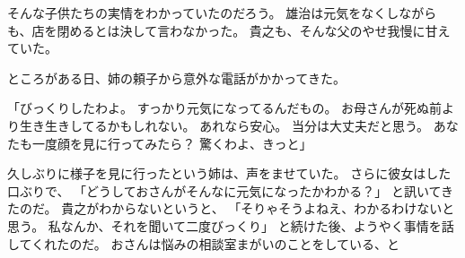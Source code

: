 \documentclass[chapter3.tex]{subfiles}
\begin{document}
\begin{CJK}{UTF8}{ipxm}
    そんな子供たちの実情をわかっていたのだろう。
    雄治は元気をなくしながらも、店を閉めるとは決して言わなかった。
    貴之も、そんな父のやせ我慢に甘えていた。

    ところがある日、姉の頼子から意外な電話がかかってきた。

    「びっくりしたわよ。
    すっかり元気になってるんだもの。
    お母さんが死ぬ前より生き生きしてるかもしれない。
    あれなら安心。
    当分は大丈夫だと思う。
    あなたも一度顔を見に行ってみたら？
    驚くわよ、きっと」

    久しぶりに様子を見に行ったという姉は、声をませていた。
    さらに彼女はした口ぶりで、
    「どうしておさんがそんなに元気になったかわかる？」
    と訊いてきたのだ。
    貴之がわからないというと、
    「そりゃそうよねえ、わかるわけないと思う。
    私なんか、それを聞いて二度びっくり」
    と続けた後、ようやく事情を話してくれたのだ。
    おさんは悩みの相談室まがいのことをしている、と

\end{CJK}
\end{document}
